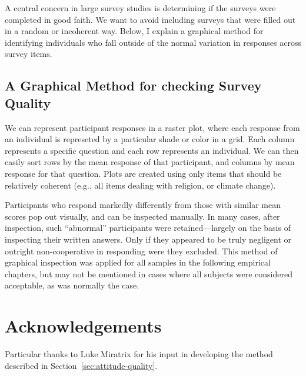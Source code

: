 A central concern in large survey studies is determining if the surveys were
completed in good faith. We want to avoid including surveys that were filled out
in a random or incoherent way. Below, I explain a graphical method for identifying individuals who fall outside
of the normal variation in responses across survey items.

\subsection{A Graphical Method for checking Survey Quality}

We can represent participant responses in a raster plot, where each response
from an individual is represeted by a particular shade or color in a grid. Each
column represents a specific question and each row represents an individual. We
can then easily sort rows by the mean response of that participant, and columns
by mean response for that question. Plots are created using only items that
should be relatively coherent (e.g., all items dealing with religion, or climate
change).

Participants who respond markedly differently from those with similar mean
scores pop out visually, and can be inspected manually. In many cases, after
inspection, such “abnormal” participants were retained---largely on the basis of
inspecting their written answers. Only if they appeared to be truly negligent or
outright non-cooperative in responding were they excluded. This method of
graphical inspection was applied for all samples in the following empirical
chapters, but may not be mentioned in cases where all subjects were considered
acceptable, as was normally the case.

\section*{Acknowledgements}

Particular thanks to Luke Miratrix for his input in developing the method
described in Section~\ref{sec:attitude-quality}.
